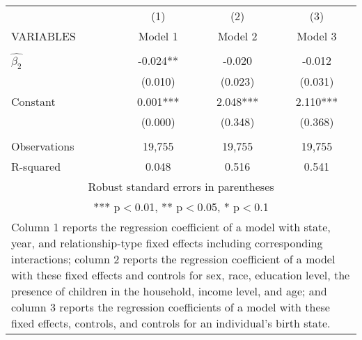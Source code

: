 \begin{tabular}{lccc}
\hline
 & (1) & (2) & (3) \\
VARIABLES & Model 1 & Model 2 & Model 3 \\ \hline
 &  &  &  \\
$\hat{\beta_2}$ & -0.024** & -0.020 & -0.012 \\
 & (0.010) & (0.023) & (0.031) \\
Constant & 0.001*** & 2.048*** & 2.110*** \\
 & (0.000) & (0.348) & (0.368) \\
 &  &  &  \\
Observations & 19,755 & 19,755 & 19,755 \\
 R-squared & 0.048 & 0.516 & 0.541 \\ \hline
\multicolumn{4}{c}{ Robust standard errors in parentheses} \\
\multicolumn{4}{c}{ *** p$<$0.01, ** p$<$0.05, * p$<$0.1} \\
\multicolumn{4}{p{0.6\linewidth}}{\footnotesize Column 1 reports the regression coefficient of a model with state, year, and relationship-type fixed effects including corresponding interactions; column 2 reports the regression coefficient of a model with these fixed effects and controls for sex, race, education level, the presence of children in the household, income level, and age; and column 3 reports the regression coefficients of a model with these fixed effects, controls, and controls for an individual’s birth state.} \\
\end{tabular}
